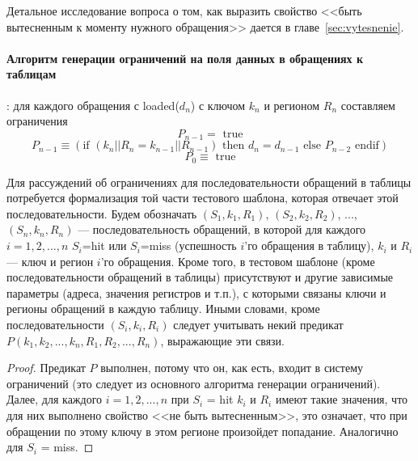 Детальное исследование вопроса о том, как выразить свойство <<быть вытесненным к
моменту нужного обращения>> дается в главе~\ref{sec:vytesnenie}.

\paragraph{Алгоритм генерации ограничений на поля данных в обращениях к таблицам}:
для каждого обращения с loaded($d_n$) с ключом $k_n$ и регионом $R_n$ составляем ограничения
$$P_{n-1} = \mbox{~true}$$
$$P_{n-1} \equiv (\mbox{if~} (k_n||R_n = k_{n-1}||R_{n-1}) \mbox{~then~} d_n =
d_{n-1} \mbox{~else~} P_{n-2} \mbox{~endif})$$
$$P_0 \equiv \mbox{~true}$$

Для рассуждений об ограничениях для последовательности обращений в таблицы потребуется формализация той части тестового шаблона, которая отвечает этой последовательности. Будем обозначать $(S_1, k_1, R_1)$, $(S_2, k_2, R_2)$, ..., $(S_n, k_n, R_n)$ --- последовательность обращений, в которой для каждого $i = 1, 2, ..., n$ $S_i${=}hit или $S_i${=}miss (успешность $i$'го обращения в таблицу), $k_i$ и $R_i$ --- ключ и регион $i$'го обращения. Кроме того, в тестовом шаблоне (кроме последовательности обращений в таблицы) присутствуют и другие зависимые параметры (адреса, значения регистров и т.п.), с которыми связаны ключи и регионы обращений в каждую таблицу. Иными словами, кроме последовательности $(S_i, k_i, R_i)$ следует учитывать некий предикат $P(k_1, k_2, ..., k_n, R_1, R_2, ..., R_n)$, выражающие эти связи.

\begin{theorem}\label{mirror_correctness}
\CorrectnessMirror
\end{theorem}
\begin{proof}
  Предикат $P$ выполнен, потому что он, как есть, входит в систему ограничений (это следует из основного алгоритма генерации ограничений). Далее, для каждого $i = 1, 2, ..., n$ при $S_i$ = hit  $k_i$ и $R_i$ имеют такие значения, что для них выполнено свойство <<не быть вытесненным>>, это означает, что при обращении по этому ключу в этом регионе произойдет попадание. Аналогично для $S_i$ = miss.
\end{proof}

\begin{theorem}\label{mirror_fullness}
\FullnessMirror
\end{theorem}

